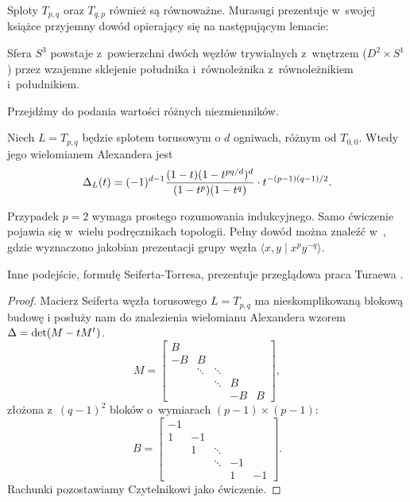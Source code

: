 Sploty $T_{p, q}$ oraz $T_{q, p}$ również są równoważne.
Murasugi prezentuje w~swojej książce \cite{murasugi96} przyjemny dowód opierający się na następującym lemacie:

\begin{lemma}
    Sfera $S^3$ powstaje z~powierzchni dwóch węzłów trywialnych z~wnętrzem ($D^2 \times S^1$) przez wzajemne sklejenie południka i~równoleżnika z~równoleżnikiem i~południkiem.
\end{lemma}

Przejdźmy do podania wartości różnych niezmienników.

\begin{proposition}
    Niech $L = T_{p, q}$ będzie splotem torusowym o $d$ ogniwach, różnym od $T_{0, 0}$.
%
    Wtedy jego wielomianem Alexandera jest
    \begin{equation}
        \Delta_L(t) = (-1)^{d-1} \frac{(1-t)(1 - t^{pq/d})^d}{(1-t^p)(1-t^q)} \cdot t^{-(p-1)(q-1)/2}.
    \end{equation}
\end{proposition}

Przypadek $p = 2$ wymaga prostego rozumowania indukcyjnego.
Samo ćwiczenie pojawia się w~wielu podręcznikach topologii.
Pełny dowód można znaleźć w~\cite[przykład 9.15]{burde14}, gdzie wyznaczono jakobian prezentacji grupy węzła $\langle x, y \mid x^py^{-q}\rangle$.

Inne podejście, formułę Seiferta-Torresa, prezentuje przeglądowa praca Turaewa \cite{turaev86}.

\begin{proof}
    Macierz Seiferta węzła torusowego $L = T_{p, q}$ ma nieskomplikowaną blokową budowę i posłuży nam do znalezienia wielomianu Alexandera wzorem $\Delta = \det (M - tM^t)$.
    \begin{equation}
        M = \begin{bmatrix}
            B & & & & \\
            -B & B & & & \\
            & \ddots & \ddots & & \\
            & & \ddots & B & \\
            & & & -B & B
        \end{bmatrix},
    \end{equation}
    złożona z~$(q-1)^2$ bloków o~wymiarach $(p-1) \times (p-1)$:
    \begin{equation}
        B = \begin{bmatrix}
            -1 & & & & \\
            1 & -1 & & & \\
            & 1 & \ddots & & \\
            & & \ddots & -1 & \\
            & & & 1 & -1
        \end{bmatrix}.
    \end{equation}
    Rachunki pozostawiamy Czytelnikowi jako ćwiczenie.
\end{proof}

